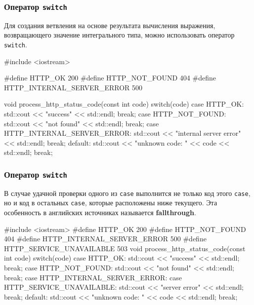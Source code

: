 \documentclass[compress, 8pt, aspectratio=169]{beamer}
\begin{document}
\begin{frame}[fragile]

    \frametitle{Оператор \texttt{switch}}

    \hfill \break

    Для создания ветвления на основе результата вычисления выражения,
    возвращающего значение интегрального типа, можно использовать
    оператор \verb|switch|.

    \begin{myinplacelisting}[%
        minted language=cpp,
        minted options={
            fontsize=\footnotesize,
            breaklines,
            breakanywhere,
            linenos,
            escapeinside=||,
            numbersep=2pt
        },
    ]
#include <iostream>

#define HTTP_OK 200
#define HTTP_NOT_FOUND 404
#define HTTP_INTERNAL_SERVER_ERROR 500

void process_http_status_code(const int code) {
    switch(code) {
        case HTTP_OK:
            std::cout << "success" << std::endl;
            break;
        case HTTP_NOT_FOUND:
            std::cout << "not found" << std::endl;
            break;
        case HTTP_INTERNAL_SERVER_ERROR:
            std::cout << "internal server error" << std::endl;
            break;
        default:
            std::cout << "unknown code: " << code << std::endl;
            break;
    }
}
    \end{myinplacelisting}

\end{frame}

\begin{frame}[fragile]

    \frametitle{Оператор \texttt{switch}}

    \hfill \break

    В случае удачной проверки одного из \verb|case| выполнится не только
    код этого \verb|case|, но и код в остальных \verb|case|, которые
    расположены ниже текущего.
    Эта особенность в английских источниках называется \textbf{fallthrough}.

    \begin{myinplacelisting}[%
        minted language=cpp,
        minted options={
            fontsize=\footnotesize,
            breaklines,
            breakanywhere,
            linenos,
            escapeinside=||,
            numbersep=2pt
        },
    ]
#include <iostream>
#define HTTP_OK 200
#define HTTP_NOT_FOUND 404
#define HTTP_INTERNAL_SERVER_ERROR 500
#define HTTP_SERVICE_UNAVAILABLE 503
void process_http_status_code(const int code) {
    switch(code) {
        case HTTP_OK:
            std::cout << "success" << std::endl;
            break;
        case HTTP_NOT_FOUND:
            std::cout << "not found" << std::endl;
            break;
        case HTTP_INTERNAL_SERVER_ERROR:
        case HTTP_SERVICE_UNAVAILABLE:
            std::cout << "server error" << std::endl;
            break;
        default:
            std::cout << "unknown code: " << code << std::endl;
            break;
    }
}
    \end{myinplacelisting}

\end{frame}
\end{document}
